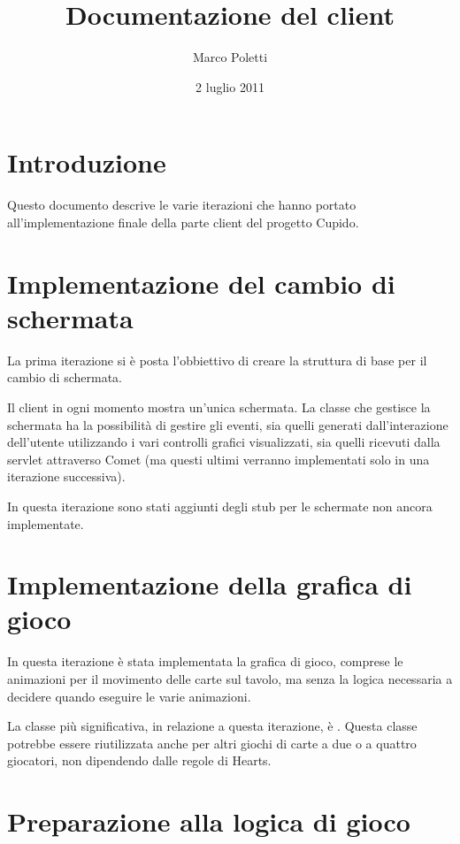 \documentclass[a4paper,12pt,final]{article}
\begin{document}
\title{Documentazione del client}
\date{2 luglio 2011}
\author{Marco Poletti}

\maketitle

\section*{Introduzione}

Questo documento descrive le varie iterazioni che hanno portato
all'implementazione finale della parte client del progetto Cupido.

\section{Implementazione del cambio di schermata}

La prima iterazione si \`e posta l'obbiettivo di creare la struttura di base
per il cambio di schermata.

Il client in ogni momento mostra un'unica schermata.
La classe che gestisce la schermata ha la possibilit\`a di gestire gli eventi,
sia quelli generati dall'interazione dell'utente utilizzando i vari controlli
grafici visualizzati, sia quelli ricevuti dalla servlet attraverso Comet
(ma questi ultimi verranno implementati solo in una iterazione successiva).

In questa iterazione sono stati aggiunti degli stub per le schermate non
ancora implementate.

\section{Implementazione della grafica di gioco}

In questa iterazione \`e stata implementata la grafica di gioco, comprese
le animazioni per il movimento delle carte sul tavolo, ma senza la logica
necessaria a decidere quando eseguire le varie animazioni.

La classe pi\`u significativa, in relazione a questa iterazione, \`e
\verb@CardsGameWidget@. Questa classe potrebbe essere riutilizzata anche
per altri giochi di carte a due o a quattro giocatori, non dipendendo dalle
regole di Hearts.

\section{Preparazione alla logica di gioco}
\end{document}
